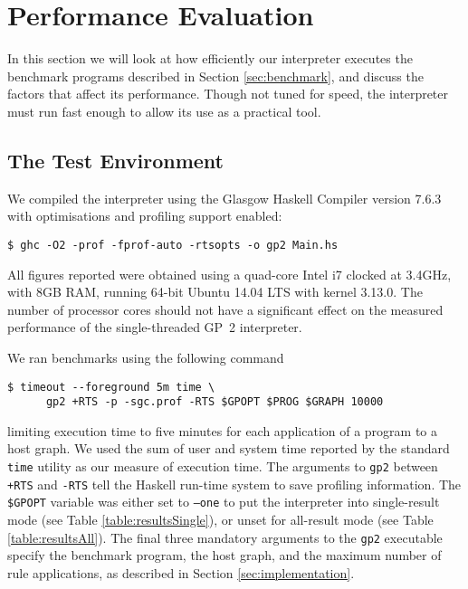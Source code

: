 \section{Performance Evaluation}
\label{sec:performanceevaluation}

In this section we will look at how efficiently our interpreter executes the benchmark programs described in Section \ref{sec:benchmark}, and discuss the factors that affect its performance. Though not tuned for speed, the interpreter must run fast enough to allow its use as a practical tool.




\subsection{The Test Environment}

We compiled the interpreter using the Glasgow Haskell Compiler\cite{ghc} version 7.6.3 with optimisations and profiling support enabled:

\begin{verbatim}
$ ghc -O2 -prof -fprof-auto -rtsopts -o gp2 Main.hs
\end{verbatim}

All figures reported were obtained using a quad-core Intel i7 clocked at 3.4GHz, with 8GB RAM, running 64-bit Ubuntu 14.04 LTS with kernel 3.13.0. The number of processor cores should not have a significant effect on the measured performance of the single-threaded GP~2 interpreter.

We ran benchmarks using the following command

\begin{verbatim}
$ timeout --foreground 5m time \
      gp2 +RTS -p -sgc.prof -RTS $GPOPT $PROG $GRAPH 10000
\end{verbatim}

\noindent
limiting execution time to five minutes for each application of a program to a host graph. We used the sum of user and system time reported by the standard \texttt{time} utility as our measure of execution time.
The arguments to \texttt{gp2} between \texttt{+RTS} and \texttt{-RTS} tell the Haskell run-time system to save profiling information.  The \texttt{\$GPOPT} variable was either set to \texttt{--one} to put the interpreter into single-result mode (see Table \ref{table:resultsSingle}), or unset for all-result mode (see Table \ref{table:resultsAll}).
The final three mandatory arguments to the \texttt{gp2} executable specify the benchmark program, the host graph, and the maximum number of rule applications, as described in Section \ref{sec:implementation}.

